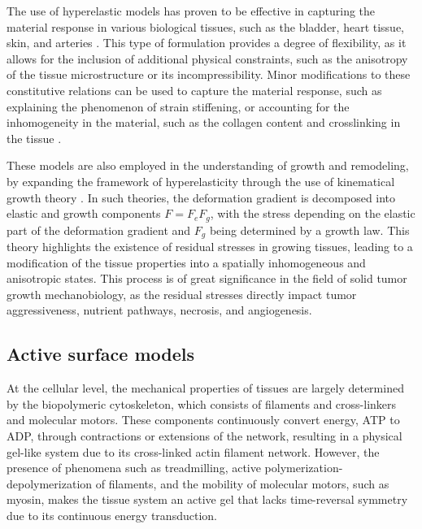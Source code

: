 The use of hyperelastic models has proven to be effective in capturing the material response in various biological tissues, such as the bladder, heart tissue, skin, and arteries \cite{holzapfel2000}. This type of formulation provides a degree of flexibility, as it allows for the inclusion of additional physical constraints, such as the anisotropy of the tissue microstructure or its incompressibility. Minor modifications to these constitutive relations can be used to capture the material response, such as explaining the phenomenon of strain stiffening, or accounting for the inhomogeneity in the material, such as the collagen content and crosslinking in the tissue \cite{holzapfel2019}.

These models are also employed in the understanding of growth and remodeling, by expanding the framework of hyperelasticity through the use of kinematical growth theory \cite{ambrosi2019}. In such theories, the deformation gradient is decomposed into elastic and growth components $F = F_e F_g$, with the stress depending on the elastic part of the deformation gradient and $F_g$ being determined by a growth law. This theory highlights the existence of residual stresses in growing tissues, leading to a modification of the tissue properties into a spatially inhomogeneous and anisotropic states. This process is of great significance in the field of solid tumor growth mechanobiology, as the residual stresses directly impact tumor aggressiveness, nutrient pathways, necrosis, and angiogenesis.

\hypertarget{active-surface-models}{%
	\subsection{Active surface models}\label{active-surface-models}}

At the cellular level, the mechanical properties of tissues are largely determined by the biopolymeric cytoskeleton, which consists of filaments and cross-linkers and molecular motors. These components continuously convert energy, ATP to ADP, through contractions or extensions of the network, resulting in a physical gel-like system due to its cross-linked actin filament network. However, the presence of phenomena such as treadmilling, active polymerization-depolymerization of filaments, and the mobility of molecular motors, such as myosin, makes the tissue system an active gel that lacks time-reversal symmetry due to its continuous energy transduction.


